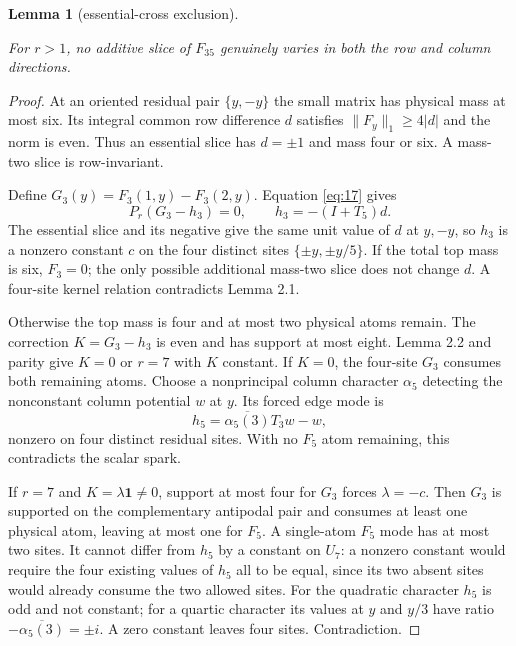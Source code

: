 \documentclass[11pt]{amsart}
\numberwithin{theorem}{section}
\newtheorem{lemma}[theorem]{Lemma}
\theoremstyle{remark}
\numberwithin{equation}{section}
\begin{document}
\begin{lemma}[essential-cross exclusion]\label{lemma:8.2}

For \(r>1\), no additive slice of \(F_{35}\) genuinely varies in both
the row and column directions.

\end{lemma}
\begin{proof}

At an oriented residual pair \(\{y,-y\}\) the small matrix has physical
mass at most six. Its integral common row difference \(d\) satisfies
\(\|F_y\|_1\ge4|d|\) and the norm is even. Thus an essential slice has
\(d=\pm1\) and mass four or six. A mass-two slice is row-invariant.

Define \(G_3(y)=F_3(1,y)-F_3(2,y)\). Equation \eqref{eq:17} gives
\[
P_r(G_3-h_3)=0,\qquad h_3=-(I+T_5)d.
\]
The essential slice and its negative give the same unit value of \(d\)
at \(y,-y\), so \(h_3\) is a nonzero constant \(c\) on the four
distinct sites \(\{\pm y,\pm y/5\}\). If the total top mass is six,
\(F_3=0\); the only possible additional mass-two slice does not change
\(d\). A four-site kernel relation contradicts Lemma 2.1.

Otherwise the top mass is four and at most two physical atoms remain.
The correction \(K=G_3-h_3\) is even and has support at most eight.
Lemma 2.2 and parity give \(K=0\) or \(r=7\) with \(K\) constant.
If \(K=0\), the four-site \(G_3\) consumes both remaining atoms. Choose
a nonprincipal column character \(\alpha_5\) detecting the nonconstant
column potential \(w\) at \(y\). Its forced edge mode is
\[
h_5=\overline{\alpha_5(3)}T_3w-w,
\]
nonzero on four distinct residual sites. With no \(F_5\) atom remaining,
this contradicts the scalar spark.

If \(r=7\) and \(K=\lambda\mathbf1\ne0\), support at most four for
\(G_3\) forces \(\lambda=-c\). Then \(G_3\) is supported on the
complementary antipodal pair and consumes at least one physical atom,
leaving at most one for \(F_5\). A single-atom \(F_5\) mode has at
most two sites. It cannot differ from \(h_5\) by a constant on \(U_7\):
a nonzero constant would require the four existing values of \(h_5\)
all to be equal, since its two absent sites would already consume the two
allowed sites. For the quadratic character \(h_5\) is odd and not
constant; for a quartic character its values at \(y\) and \(y/3\) have
ratio \(-\overline{\alpha_5(3)}=\pm i\). A zero constant leaves four
sites. Contradiction.
\end{proof}
\end{document}
